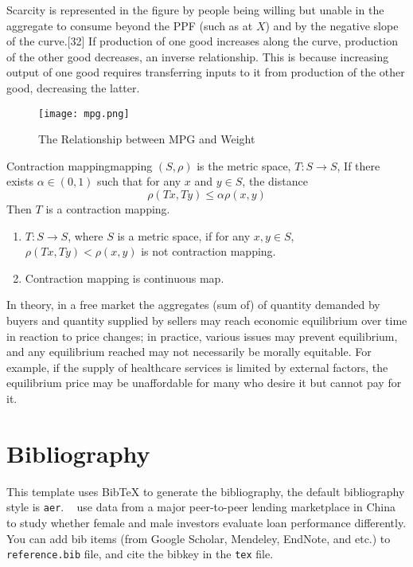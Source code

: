 \documentclass[titlestyle=hang,11pt]{elegantbook}
\begin{document}
Scarcity is represented in the figure by people being willing but unable in the aggregate to consume beyond the PPF (such as at $X$) and by the negative slope of the curve.[32] If production of one good increases along the curve, production of the other good decreases, an inverse relationship. This is because increasing output of one good requires transferring inputs to it from production of the other good, decreasing the latter.

\begin{figure}[!htbp]
	\centering
	\texttt{[image: mpg.png]}
	\caption{The Relationship between MPG and Weight\label{fig:mpg}}
\end{figure}

\begin{definition}{Contraction mapping}{mapping}
$(S,\rho)$ is the metric space, $T: S\to S$, If there exists $\alpha\in(0,1)$ such that for any $x$ and $y\in S$, the distance
\begin{equation}
\rho(Tx,Ty)\leq \alpha\rho(x,y)
\end{equation}
Then $T$ is a {\color{main} contraction mapping}.
\end{definition}

\begin{remark}
\begin{enumerate}[noitemsep]
\item $T:S\to S$, where $S$ is a metric space, if  for any $x,y\in S$, $\rho(Tx,Ty)<\rho(x,y)$ is not contraction mapping.
\item Contraction mapping is continuous map.
\end{enumerate}
\end{remark}


\begin{conclusion}
In theory, in a free market the aggregates (sum of) of quantity demanded by buyers and quantity supplied by sellers may reach economic equilibrium over time in reaction to price changes; in practice, various issues may prevent equilibrium, and any equilibrium reached may not necessarily be morally equitable. For example, if the supply of healthcare services is limited by external factors, the equilibrium price may be unaffordable for many who desire it but cannot pay for it.
\end{conclusion}

\section{Bibliography}
This template uses Bib\TeX{} to generate the bibliography, the default bibliography style is \verb|aer|. ~\cite{Chen2018} use data from a major peer-to-peer lending marketplace in China to study whether female and male investors evaluate loan performance differently. You can add bib items (from Google Scholar, Mendeley, EndNote, and etc.) to \verb|reference.bib| file, and cite the bibkey in the \verb|tex| file.


\nocite{EINAV2010,Havrylchyk2018} 




\end{document}
